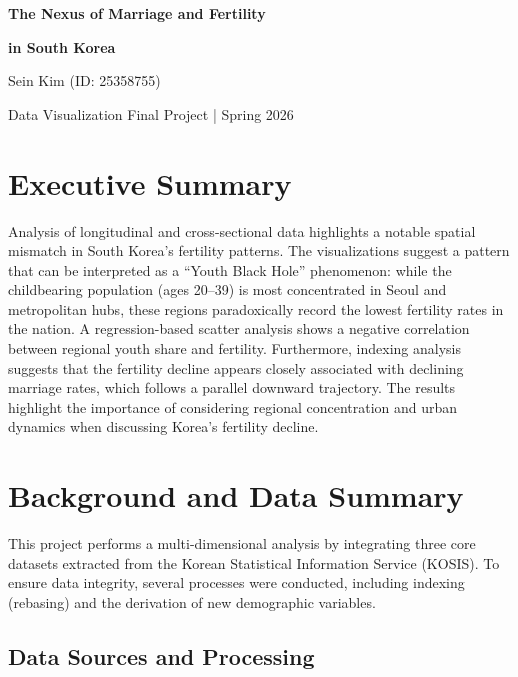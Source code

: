 \documentclass[12pt,letterpaper]{article}
\begin{document}
	
\begin{center}
	{\LARGE \textbf{The Nexus of Marriage and Fertility}\par}
	\vspace{0.3em}
	{\LARGE \textbf{in South Korea}\par}
	\vspace{1.5em}
	
	{\large Sein Kim (ID: 25358755)\par}
	\vspace{1.0em}
	
	{\small Data Visualization Final Project | Spring 2026\par}
\end{center}
\vspace{2.0em}
	
	\tableofcontents
	\newpage
	
	\section{Executive Summary}
	Analysis of longitudinal and cross-sectional data highlights a notable spatial mismatch in South Korea’s fertility patterns. The visualizations suggest a pattern that can be interpreted as a “Youth Black Hole” phenomenon: while the childbearing population (ages 20–39) is most concentrated in Seoul and metropolitan hubs, these regions paradoxically record the lowest fertility rates in the nation. A regression-based scatter analysis shows a negative correlation between regional youth share and fertility. Furthermore, indexing analysis suggests that the fertility decline appears closely associated with declining marriage rates, which follows a parallel downward trajectory. The results highlight the importance of considering regional concentration and urban dynamics when discussing Korea’s fertility decline.
	
	\section{Background and Data Summary}
	This project performs a multi-dimensional analysis by integrating three core datasets extracted from the Korean Statistical Information Service (KOSIS). To ensure data integrity, several  processes were conducted, including indexing (rebasing) and the derivation of new demographic variables.
	
	\subsection{Data Sources and Processing}
	
\end{document}
